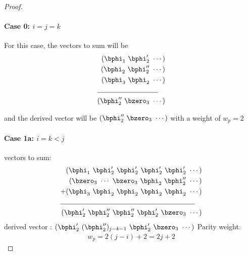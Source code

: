 \documentclass[11pt, oneside, dvipdfmx]{book}
\begin{document}
\begin{proof}
\paragraph{Case 0: $i=j=k$ \newline}

 For this case, the vectors to sum will be 
 \begin{align*}
(\bphi_1~\bphi'_2~\cdots)\\
(\bphi_2~\bphi''_2~\cdots)\\
(\bphi_3~\bphi_2~\cdots)\\
\cline{1-2}
(\bphi''_2~\bzero_{3}~\cdots)
\end{align*}
 
and  the derived vector will be $(\bphi''_2~\bzero_{3}~\cdots)$ with a weight of $w_p=2$
 
 

\paragraph{Case 1a: $i=k<j$ \newline}
 vectors to sum:
 \begin{align*}
(\bphi_1~\bphi'_2~\bphi'_2~\bphi'_2~\bphi'_2~\cdots)\\
(\bzero_{3}~\cdots~\bzero_{3}~\bphi_2~\bphi''_2~\cdots)\\
+(\bphi_3~\bphi_2~\bphi_2~\bphi_2~\bphi_2~\cdots)\\
\cline{1-2}
(\bphi'_2~\bphi''_2~\bphi''_2~\bphi'_2~\bzero_3~\cdots)
\end{align*}
derived vector : $(\bphi'_2~(\bphi''_2)_{j-k-1}~\bphi'_2~\bzero_3~\cdots)$
\newline
Parity weight: \begin{equation}
\begin{split}
w_p=2(j-i)+2 =2j+2
\end{split}
\end{equation}


\end{proof}
\end{document}
